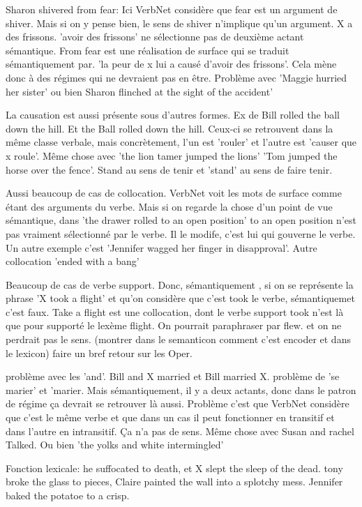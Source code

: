 Sharon shivered from fear: Ici VerbNet considère que fear est un argument de shiver. Mais si on y pense bien, le sens de shiver n'implique qu'un argument. X a des frissons. 'avoir des frissons' ne sélectionne pas de deuxième actant sémantique. From fear est une réalisation de surface qui se traduit sémantiquement par. 'la peur de x lui a causé d'avoir des frissons'. Cela mène donc à des régimes qui ne devraient pas en être. Problème avec 'Maggie hurried her sister' ou bien Sharon flinched at the sight of the accident'

La causation est aussi présente sous d'autres formes. Ex de Bill rolled the ball down the hill. Et the Ball rolled down the hill. Ceux-ci se retrouvent dans la même classe verbale, mais concrètement, l'un est 'rouler' et l'autre est 'causer que x roule'. Même chose avec 'the lion tamer jumped the lions' 'Tom jumped the horse over the fence'. Stand au sens de tenir et 'stand' au sens de faire tenir.

Aussi beaucoup de cas de collocation. VerbNet voit les mots de surface comme étant des arguments du verbe. Mais si on regarde la chose d'un point de vue sémantique, 	dans 'the drawer rolled to an open position' to an open position n'est pas vraiment sélectionné par le verbe. Il le modife, c'est lui qui gouverne le verbe. Un autre exemple c'est 'Jennifer wagged her finger in disapproval'. Autre collocation 'ended with a bang'

Beaucoup de cas de verbe support. Donc, sémantiquement , si on se représente la phrase 'X took a flight' et qu'on considère que c'est took le verbe, sémantiquemet c'est faux. Take a flight est une collocation, dont le verbe support took n'est là que pour supporté le lexème flight. On pourrait paraphraser par flew. et on ne perdrait pas le sens. (montrer dans le semanticon comment c'est encoder et dans le lexicon) faire un bref retour sur les Oper.

problème avec les 'and'. Bill and X married et Bill married X. problème de 'se marier' et 'marier. Mais sémantiquement, il y a deux actants, donc dans le patron de régime ça devrait se retrouver là aussi. Problème c'est que VerbNet considère que c'est le même verbe et que dans un cas il peut fonctionner en transitif et dans l'autre en intransitif. Ça n'a pas de sens. Même chose avec Susan and rachel Talked.	Ou bien 'the yolks and white intermingled'

Fonction lexicale: he suffocated to death, et X slept the sleep of the dead. tony broke the glass to pieces, Claire painted the wall into a splotchy mess. Jennifer baked the potatoe to a crisp.

